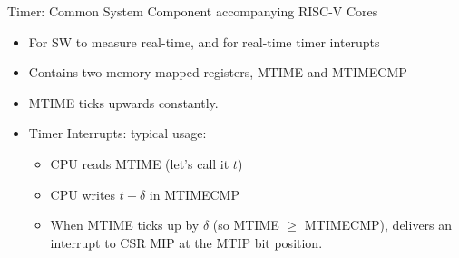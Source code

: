 \documentclass{article}
\begin{document}
\clearpage


\begin{center}
  {\Huge
    Timer: Common System Component accompanying RISC-V Cores}

  \vspace*{0.2in}


  \vspace*{0.3in}

  \begin{minipage}[t]{9in}
    \begin{itemize}\LARGE
    \item For SW to measure real-time, and for real-time timer interupts
    \item Contains two memory-mapped registers, MTIME and MTIMECMP
    \item MTIME ticks upwards constantly.
    \item Timer Interrupts: typical usage:
      \begin{itemize}
      \item CPU reads MTIME (let's call it $t$)
      \item CPU writes $t + \delta$ in MTIMECMP
      \item When MTIME ticks up by $\delta$ (so MTIME $\geq$
        MTIMECMP), delivers an interrupt to CSR MIP at the MTIP bit position.
      \end{itemize}
    \end{itemize}
  \end{minipage}
\end{center}

\clearpage
\end{document}
